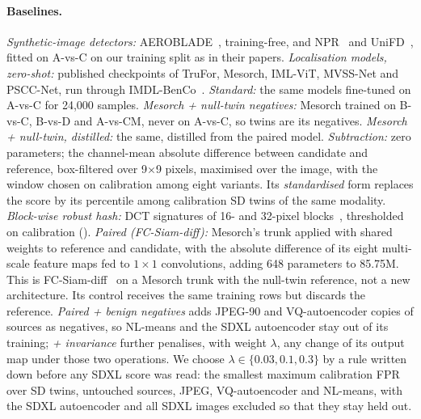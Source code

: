 \paragraph{Baselines.}
\emph{Synthetic-image detectors:} AEROBLADE~\cite{ricker2024aeroblade}, training-free, and NPR~\cite{tan2024npr} and UniFD~\cite{ojha2023unifd}, fitted on A-vs-C on our training split as in their papers.
\emph{Localisation models, zero-shot:} published checkpoints of TruFor, Mesorch, IML-ViT, MVSS-Net and PSCC-Net, run through IMDL-BenCo~\cite{ma2024imdlbenco}.
\emph{Standard:} the same models fine-tuned on A-vs-C for 24,000 samples. %
\emph{Mesorch + null-twin negatives:} Mesorch trained on B-vs-C, B-vs-D and A-vs-CM, never on A-vs-C, so twins are its negatives.
\emph{Mesorch + null-twin, distilled:} the same, distilled from the paired model.
\emph{Subtraction:} zero parameters; the channel-mean absolute difference between candidate and reference, box-filtered over 9$\times$9 pixels, maximised over the image, with the window chosen on calibration among eight variants. %
Its \emph{standardised} form replaces the score by its percentile among calibration SD twins of the same modality.
\emph{Block-wise robust hash:} DCT signatures of 16- and 32-pixel blocks~\cite{venkatesan2000hash,swaminathan2006hash}, thresholded on calibration ().
\emph{Paired (FC-Siam-diff):} Mesorch's trunk applied with shared weights to reference and candidate, with the absolute difference of its eight multi-scale feature maps fed to $1{\times}1$ convolutions, adding 648 parameters to 85.75M. %
This is FC-Siam-diff~\cite{daudt2018fcsiam} on a Mesorch trunk with the null-twin reference, not a new architecture.
Its control receives the same training rows but discards the reference.
\emph{Paired + benign negatives} adds JPEG-90 and VQ-autoencoder copies of sources as negatives, so NL-means and the SDXL autoencoder stay out of its training;
\emph{+ invariance} further penalises, with weight $\lambda$, any change of its output map under those two operations. %
We choose $\lambda\in\{0.03, 0.1, 0.3\}$ by a rule written down before any SDXL score was read: the smallest maximum calibration FPR over SD twins, untouched sources, JPEG, VQ-autoencoder and NL-means, with the SDXL autoencoder and all SDXL images excluded so that they stay held out. %
